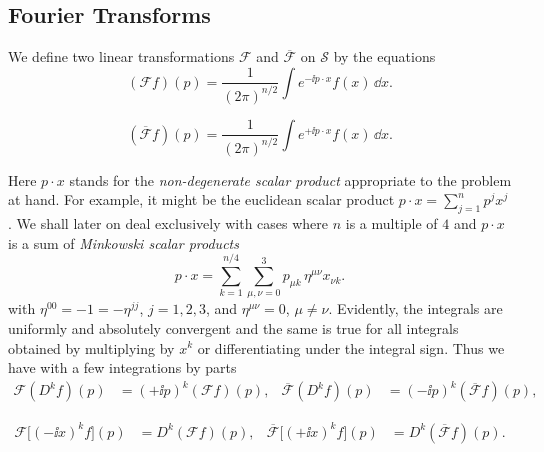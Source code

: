 \subsection{Fourier Transforms}\label{sec:ch2-fourier}

We define two linear transformations $\mathcal{F}$ and
$\overline{\mathcal{F}}$ on $\mathcal{S}$ by the equations
\begin{equation}
  (\mathcal{F}f)(p)
  = \frac{1}{(2\pi)^{n/2}}\int e^{-\ii p\cdot x}f(x)\,\dd x .
  \tag{2-33}\label{eq:ch2-fourier-forward}
\end{equation}

\begin{equation}
  (\overline{\mathcal{F}}f)(p)
  = \frac{1}{(2\pi)^{n/2}}\int e^{+\ii p\cdot x}f(x)\,\dd x .
  \tag{2-34}\label{eq:ch2-fourier-inverse}
\end{equation}

Here $p\cdot x$ stands for the \emph{non-degenerate scalar product}
appropriate to the problem at hand.  For example, it might be the
euclidean scalar product $p\cdot x=\sum_{j=1}^n p^j x^j$.  We shall later
on deal exclusively with cases where $n$ is a multiple of $4$ and $p\cdot x$
is a sum of \emph{Minkowski scalar products}
\begin{equation*}
  p\cdot x
  = \sum_{k=1}^{n/4}\sum_{\mu,\nu=0}^{3}
      p_{\mu k}\,\eta^{\mu\nu}x_{\nu k}.
\end{equation*}
with $\eta^{00}=-1=-\eta^{jj}$, $j=1,2,3$, and
$\eta^{\mu\nu}=0$, $\mu\ne\nu$.  Evidently, the integrals are uniformly and
absolutely convergent and the same is true for all integrals obtained by
multiplying by $x^k$ or differentiating under the integral sign.  Thus we
have with a few integrations by parts
\begin{equation}
\begin{aligned}
  \mathcal{F}(D^k f)(p)&=(+\ii p)^k(\mathcal{F}f)(p),
  &\overline{\mathcal{F}}(D^k f)(p)&=(-\ii p)^k(\overline{\mathcal{F}}f)(p),
\end{aligned}
\tag{2-35}\label{eq:ch2-fourier-derivative}
\end{equation}

\begin{equation}
\begin{aligned}
  \mathcal{F}\bigl[(-\ii x)^k f\bigr](p)&=D^k(\mathcal{F}f)(p),
  &\overline{\mathcal{F}}\bigl[(+\ii x)^k f\bigr](p)&=D^k(\overline{\mathcal{F}}f)(p).
\end{aligned}
\tag{2-36}\label{eq:ch2-fourier-multiplication}
\end{equation}

